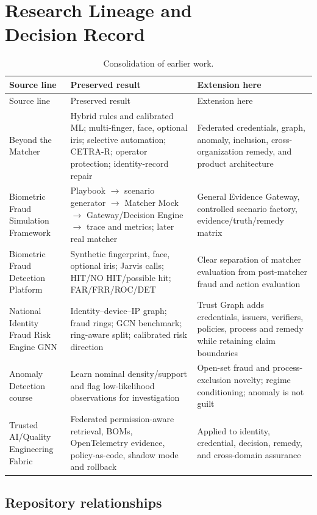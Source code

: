 \chapter[Research Lineage and Decision Record]{Research Lineage and\\Decision Record}

\begin{longtable}{p{35mm}p{52mm}p{58mm}}
\caption{Consolidation of earlier work.}\label{tab:lineage}\\
\toprule
Source line & Preserved result & Extension here\\
\midrule
\endfirsthead
\toprule
Source line & Preserved result & Extension here\\
\midrule
\endhead
Beyond the Matcher & Hybrid rules and calibrated ML; multi-finger, face, optional iris; selective automation; CETRA-R; operator protection; identity-record repair & Federated credentials, graph, anomaly, inclusion, cross-organization remedy, and product architecture\\
Biometric Fraud Simulation Framework & Playbook $\rightarrow$ scenario generator $\rightarrow$ Matcher Mock $\rightarrow$ Gateway/Decision Engine $\rightarrow$ trace and metrics; later real matcher & General Evidence Gateway, controlled scenario factory, evidence/truth/remedy matrix\\
Biometric Fraud Detection Platform & Synthetic fingerprint, face, optional iris; Jarvis calls; HIT/NO HIT/possible hit; FAR/FRR/ROC/DET & Clear separation of matcher evaluation from post-matcher fraud and action evaluation\\
National Identity Fraud Risk Engine GNN & Identity--device--IP graph; fraud rings; GCN benchmark; ring-aware split; calibrated risk direction & Trust Graph adds credentials, issuers, verifiers, policies, process and remedy while retaining claim boundaries\\
Anomaly Detection course & Learn nominal density/support and flag low-likelihood observations for investigation & Open-set fraud and process-exclusion novelty; regime conditioning; anomaly is not guilt\\
Trusted AI/Quality Engineering Fabric & Federated permission-aware retrieval, BOMs, OpenTelemetry evidence, policy-as-code, shadow mode and rollback & Applied to identity, credential, decision, remedy, and cross-domain assurance\\
\bottomrule
\end{longtable}

\section{Repository relationships}

